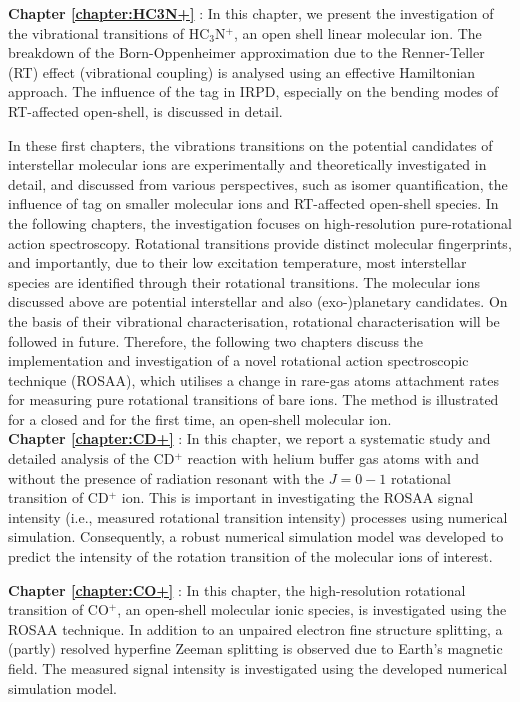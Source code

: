\textbf{Chapter \ref{chapter:HC3N+}} \emph{}: In this chapter, we present the investigation of the vibrational transitions of HC$_3$N$^+$, an open shell linear molecular ion. The breakdown of the Born-Oppenheimer approximation due to the Renner-Teller (RT) effect (vibrational coupling) is analysed using an effective Hamiltonian approach. The influence of the tag in IRPD, especially on the bending modes of RT-affected open-shell, is discussed in detail.

In these first chapters, the vibrations transitions on the potential candidates of interstellar molecular ions are experimentally and theoretically investigated in detail, and discussed from various perspectives, such as isomer quantification, the influence of tag on smaller molecular ions and RT-affected open-shell species. In the following chapters, the investigation focuses on high-resolution pure-rotational action spectroscopy. Rotational transitions provide distinct molecular fingerprints, and importantly, due to their low excitation temperature, most interstellar species are identified through their rotational transitions. The molecular ions discussed above are potential interstellar and also (exo-)planetary candidates. On the basis of their vibrational characterisation, rotational characterisation will be followed in future. Therefore, the following two chapters discuss the implementation and investigation of a novel rotational action spectroscopic technique (ROSAA), which utilises a change in rare-gas atoms attachment rates for measuring pure rotational transitions of bare ions. The method is illustrated for a closed and for the first time, an open-shell molecular ion. \\

\textbf{Chapter \ref{chapter:CD+}} \emph{}: In this chapter, we report a systematic study and detailed analysis of the CD$^+$ reaction with helium buffer gas atoms with and without the presence of radiation resonant with the $J=0-1$ rotational transition of CD$^+$ ion. This is important in investigating the ROSAA signal intensity (i.e., measured rotational transition intensity) processes using numerical simulation. Consequently, a robust numerical simulation model was developed to predict the intensity of the rotation transition of the molecular ions of interest.

\textbf{Chapter \ref{chapter:CO+}} \emph{}: In this chapter, the high-resolution rotational transition of CO$^+$, an open-shell molecular ionic species, is investigated using the ROSAA technique. In addition to an unpaired electron fine structure splitting, a (partly) resolved hyperfine Zeeman splitting is observed due to Earth's magnetic field. The measured signal intensity is investigated using the developed numerical simulation model.\\
